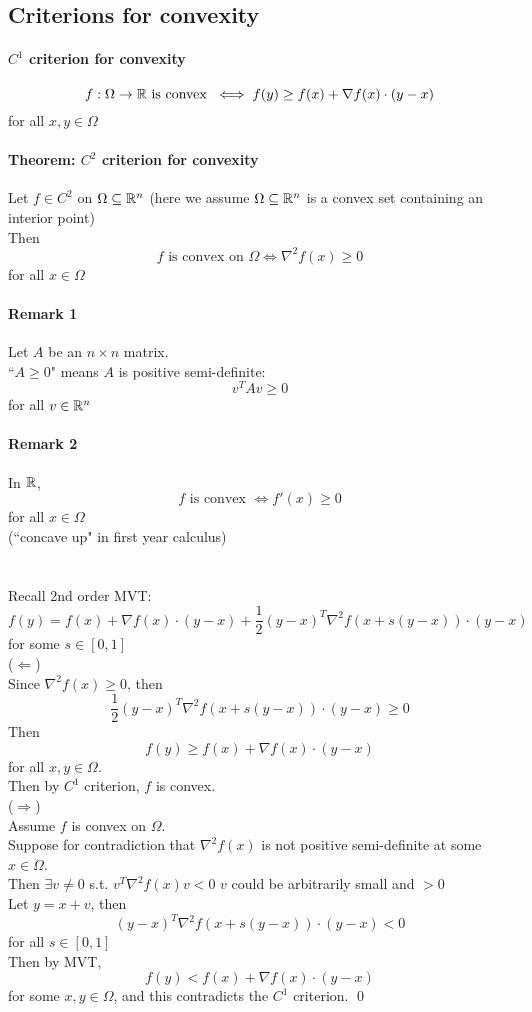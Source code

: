 \documentclass[11pt]{article}
\begin{document}
\subsection{Criterions for convexity}
\paragraph{$C^1$ criterion for convexity}
$$f: \Omega \rightarrow \mathbb{R} \text{ is convex } \iff f(y) \geq f(x) + \nabla f(x) \cdot (y-x)$$
for all $x, y \in \Omega$

\paragraph{Theorem: $C^2$ criterion for convexity}
Let $f \in C^2$ on $\Omega \subseteq \mathbb{R}^n$ (here we assume $\Omega \subseteq \mathbb{R}^n$ is a convex set containing an interior point) \\
Then $$f \text{ is convex on } \Omega \iff \nabla^2 f(x) \geq 0$$ for all $x \in \Omega$


\paragraph{Remark 1}
Let $A$ be an $n \times n$ matrix.\\
``$A \geq 0$" means $A$ is positive semi-definite:
$$v^TAv \geq 0$$ for all $v \in \mathbb{R}^n$

\paragraph{Remark 2}
In $\mathbb{R}$, 
$$f \text{ is convex } \iff f'(x) \geq 0$$ for all $x \in \Omega$ \\
(``concave up" in first year calculus) \\\\
 \\
Recall 2nd order MVT: \\
$$f(y) = f(x) + \nabla f(x)\cdot (y-x) + \frac{1}{2}(y-x)^T \nabla^2 f(x+s(y-x))\cdot (y-x)$$
for some $s \in [0,1]$ \\
($\Leftarrow$) \\
Since $\nabla^2 f(x) \geq 0$, then 
$$\frac{1}{2}(y-x)^T \nabla^2 f(x+s(y-x))\cdot (y-x) \geq 0$$
Then
$$f(y) \geq f(x) + \nabla f(x) \cdot (y-x)$$
for all $x, y \in \Omega$. \\
Then by $C^1$ criterion,
$f$ is convex. \\
($\Rightarrow$) \\
Assume $f$ is convex on $\Omega$. \\
Suppose for contradiction that $\nabla^2 f(x)$ is not positive semi-definite at some $x \in \Omega$. \\
Then $\exists v \neq 0$ s.t. $v^T \nabla^2f(x) v < 0$
$v$ could be arbitrarily small and $>0$\\
Let $y = x + v$, then
$$(y-x)^T\nabla^2 f(x + s(y-x))\cdot (y-x) < 0$$
for all $s \in [0,1]$ \\
Then by MVT,
$$f(y) < f(x) + \nabla f(x)\cdot(y-x)$$
for some $x, y \in \Omega$, and this contradicts the $C^1$ criterion. \qed
\end{document}
